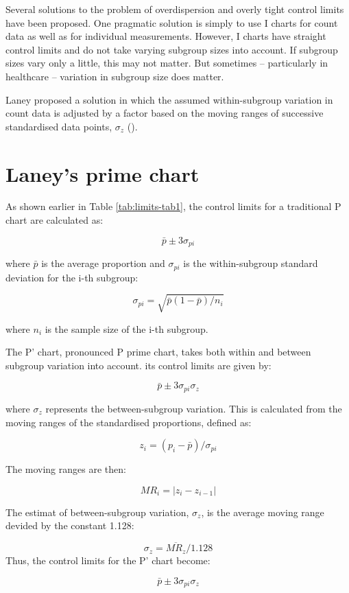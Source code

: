 \documentclass[
]{book}
\begin{document}
Several solutions to the problem of overdispersion and overly tight control limits have been proposed. One pragmatic solution is simply to use I charts for count data as well as for individual measurements. However, I charts have straight control limits and do not take varying subgroup sizes into account. If subgroup sizes vary only a little, this may not matter. But sometimes -- particularly in healthcare -- variation in subgroup size does matter.

Laney proposed a solution in which the assumed within-subgroup variation in count data is adjusted by a factor based on the moving ranges of successive standardised data points, \(\sigma_z\) ().

\section{Laney's prime chart}\label{laneys-prime-chart}

As shown earlier in Table \ref{tab:limits-tab1}, the control limits for a traditional P chart are calculated as:

\[\bar{p}\pm3\sigma_{pi}\]

where \(\bar{p}\) is the average proportion and \(\sigma_{pi}\) is the within-subgroup standard deviation for the i-th subgroup:

\[\sigma_{pi}=\sqrt{\bar{p}(1-\bar{p})/{n_{i}}}\]

where \(n_i\) is the sample size of the i-th subgroup.

The P' chart, pronounced P prime chart, takes both within and between subgroup variation into account. its control limits are given by:

\[\bar{p}\pm3\sigma_{pi}\sigma_z\]

where \(\sigma_z\) represents the between-subgroup variation. This is calculated from the moving ranges of the standardised proportions, defined as:

\[z_i=(p_i - \bar{p})/\sigma_{pi}\]

The moving ranges are then:

\[MR_i=|z_i-z_{i-1}|\]

The estimat of between-subgroup variation, \(\sigma_z\), is the average moving range devided by the constant 1.128:

\[\sigma_z=\overline{MR_z}/1.128\]
Thus, the control limits for the P' chart become:

\[\bar{p}\pm3\sigma_{pi}\sigma_z \]
\end{document}

